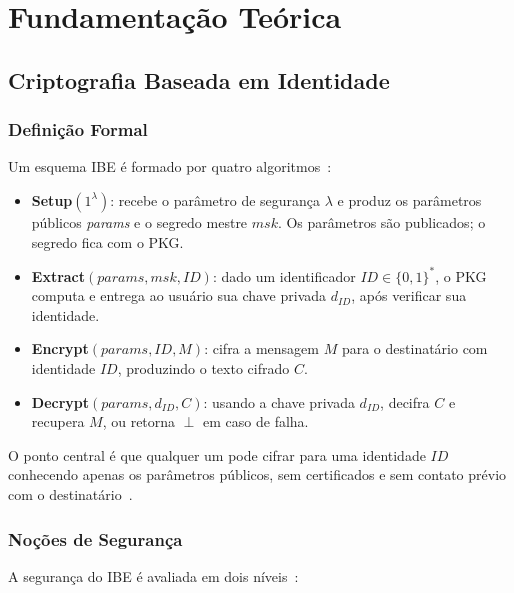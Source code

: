 \chapter{Fundamentação Teórica}
\label{cap:fundamentacao}

\section{Criptografia Baseada em Identidade}
\label{sec:conceitos}

\subsection{Definição Formal}

Um esquema IBE é formado por quatro algoritmos~\cite{boneh2001ibe}:

\begin{itemize}
  \item \textbf{Setup}$(1^\lambda)$: recebe o parâmetro de segurança $\lambda$ e produz os
    parâmetros públicos \textit{params} e o segredo mestre $\mathit{msk}$. Os parâmetros são
    publicados; o segredo fica com o PKG.

  \item \textbf{Extract}$(\mathit{params}, \mathit{msk}, \mathit{ID})$: dado um identificador
    $\mathit{ID} \in \{0,1\}^*$, o PKG computa e entrega ao usuário sua chave privada
    $d_{\mathit{ID}}$, após verificar sua identidade.

  \item \textbf{Encrypt}$(\mathit{params}, \mathit{ID}, M)$: cifra a mensagem $M$ para o
    destinatário com identidade $\mathit{ID}$, produzindo o texto cifrado $C$.

  \item \textbf{Decrypt}$(\mathit{params}, d_{\mathit{ID}}, C)$: usando a chave privada
    $d_{\mathit{ID}}$, decifra $C$ e recupera $M$, ou retorna $\perp$ em caso de falha.
\end{itemize}

O ponto central é que qualquer um pode cifrar para uma identidade $\mathit{ID}$ conhecendo
apenas os parâmetros públicos, sem certificados e sem contato prévio com o
destinatário~\cite{franklin2008nist}.

\subsection{Noções de Segurança}

A segurança do IBE é avaliada em dois níveis~\cite{boneh2001ibe}:

